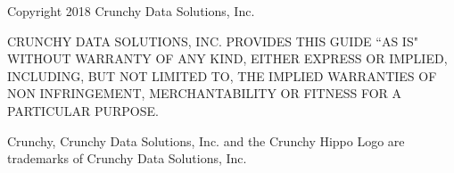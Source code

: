 \documentclass[letterpaper,12pt]{article}
\begin{document}
Copyright {\textcopyright} 2018 Crunchy Data Solutions, Inc.

CRUNCHY DATA SOLUTIONS, INC. PROVIDES THIS GUIDE ``AS IS" WITHOUT WARRANTY OF ANY KIND, EITHER EXPRESS OR IMPLIED, INCLUDING, BUT NOT LIMITED TO, THE IMPLIED WARRANTIES OF NON INFRINGEMENT, MERCHANTABILITY OR FITNESS FOR A PARTICULAR PURPOSE.

Crunchy, Crunchy Data Solutions, Inc. and the Crunchy Hippo Logo are trademarks of Crunchy Data Solutions, Inc.

\end{document}
